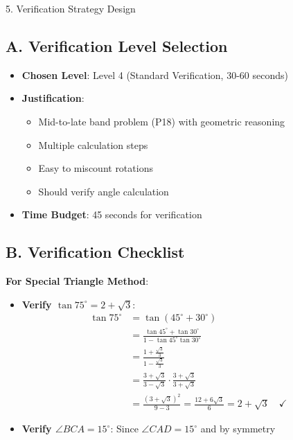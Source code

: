 \documentclass[12pt]{article}
\begin{document}
\begin{verificationbox}{5. Verification Strategy Design}

\subsection*{A. Verification Level Selection}
\begin{itemize}[leftmargin=*]
    \item \textbf{Chosen Level}: Level 4 (Standard Verification, 30-60 seconds)
    
    \item \textbf{Justification}: 
    \begin{itemize}
        \item Mid-to-late band problem (P18) with geometric reasoning
        \item Multiple calculation steps
        \item Easy to miscount rotations
        \item Should verify angle calculation
    \end{itemize}
    
    \item \textbf{Time Budget}: 45 seconds for verification
\end{itemize}

\subsection*{B. Verification Checklist}

\textbf{For Special Triangle Method}:
\begin{itemize}
    \item \textbf{Verify $\tan 75^\circ = 2+\sqrt{3}$}:
    \begin{align*}
    \tan 75^\circ &= \tan(45^\circ + 30^\circ)\\
    &= \frac{\tan 45^\circ + \tan 30^\circ}{1 - \tan 45^\circ \tan 30^\circ}\\
    &= \frac{1 + \frac{\sqrt{3}}{3}}{1 - \frac{\sqrt{3}}{3}}\\
    &= \frac{3 + \sqrt{3}}{3 - \sqrt{3}} \cdot \frac{3+\sqrt{3}}{3+\sqrt{3}}\\
    &= \frac{(3+\sqrt{3})^2}{9-3} = \frac{12+6\sqrt{3}}{6} = 2 + \sqrt{3} \quad \checkmark
    \end{align*}
    
    \item \textbf{Verify $\angle BCA = 15^\circ$}: Since $\angle CAD = 15^\circ$ and by symmetry \checkmark
    

\end{itemize}
\end{verificationbox}
\end{document}
